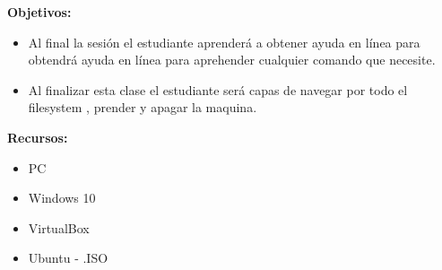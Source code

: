 \documentclass[11pt,twoside]{book}
\begin{document}
\textbf{Objetivos:}
\begin{itemize}
  \item Al final la sesión el estudiante aprenderá a obtener ayuda en línea para obtendrá ayuda en línea para aprehender cualquier comando que necesite.
  \item Al finalizar esta clase el estudiante será capas de navegar por todo el filesystem , prender y apagar la maquina.
\end{itemize}

\textbf{Recursos:}
\begin{itemize}
  \item PC
  \item Windows 10
  \item VirtualBox
  \item Ubuntu - .ISO
\end{itemize}
\end{document}
